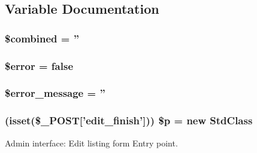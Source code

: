 \subsection{Variable Documentation}
\hypertarget{property__edit_8php_a087d68ed24331ab3812a5b17dd679580}{
\subsubsection[{\$combined}]{\setlength{\rightskip}{0pt plus 5cm}\$combined = ''}}
\label{d3/d05/property__edit_8php_a087d68ed24331ab3812a5b17dd679580}
\hypertarget{property__edit_8php_aeba2ab722cedda53dbb7ec1a59f45550}{
\subsubsection[{\$error}]{\setlength{\rightskip}{0pt plus 5cm}\$error = false}}
\label{d3/d05/property__edit_8php_aeba2ab722cedda53dbb7ec1a59f45550}
\hypertarget{property__edit_8php_ae838cbd355959defbd4d49d0fbe7b273}{
\subsubsection[{\$error\_\-message}]{\setlength{\rightskip}{0pt plus 5cm}\$error\_\-message = ''}}
\label{d3/d05/property__edit_8php_ae838cbd355959defbd4d49d0fbe7b273}
\hypertarget{property__edit_8php_a57c5f9c8f1c65a717492ed566d2f7d39}{
\subsubsection[{\$p}]{ (isset(\$\_\-POST\mbox{[}'edit\_\-finish'\mbox{]})) \$p = new StdClass}}
\label{d3/d05/property__edit_8php_a57c5f9c8f1c65a717492ed566d2f7d39}


Admin interface: Edit listing form Entry point. 

